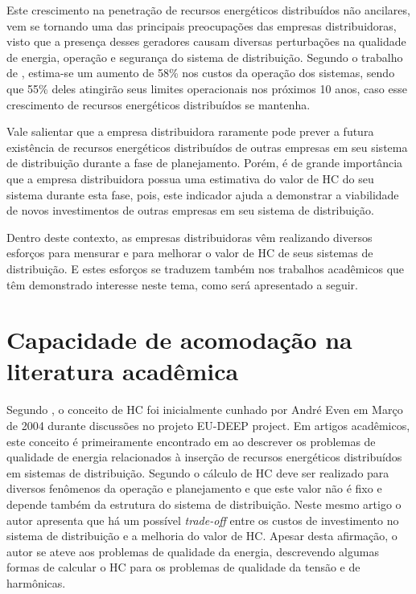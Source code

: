 Este crescimento na penetração de recursos energéticos distribuídos não ancilares, vem se tornando uma das principais preocupações das empresas distribuidoras, visto que a presença desses geradores causam diversas perturbações na qualidade de energia, operação e segurança do sistema de distribuição. Segundo o trabalho de , estima-se um aumento de 58\% nos custos da operação dos sistemas, sendo que 55\% deles atingirão seus limites operacionais nos próximos 10 anos, caso esse crescimento de recursos energéticos distribuídos se mantenha.

Vale salientar que  a empresa distribuidora raramente pode prever a futura existência de recursos energéticos distribuídos de outras empresas em seu sistema de distribuição durante a fase de planejamento. Porém, é de grande importância que a empresa distribuidora possua uma estimativa do valor de \ac{HC} do seu sistema durante esta fase, pois, este indicador ajuda a demonstrar a viabilidade de novos investimentos de outras empresas em seu sistema de distribuição. 

Dentro deste contexto, as empresas distribuidoras vêm realizando diversos esforços para mensurar e para melhorar o valor de HC de seus sistemas de distribuição. E estes esforços se traduzem também nos trabalhos acadêmicos que têm demonstrado interesse neste tema, como será apresentado a seguir.

\section{Capacidade de acomodação na literatura acadêmica}

Segundo , o conceito de HC foi inicialmente cunhado por André Even em Março de 2004 durante discussões no projeto EU-DEEP project. Em artigos acadêmicos, este conceito é primeiramente encontrado em  ao descrever os problemas de qualidade de energia relacionados à inserção de recursos energéticos distribuídos em sistemas de distribuição. Segundo  o cálculo de HC deve ser realizado para diversos fenômenos da operação e planejamento e que este valor não é fixo e depende também da estrutura do sistema de distribuição. Neste mesmo artigo o autor apresenta que há um possível \textit{trade-off} entre os custos de investimento no sistema de distribuição e a melhoria do valor de HC. Apesar desta afirmação, o autor se ateve aos problemas de qualidade da energia, descrevendo algumas formas de calcular o HC para os problemas de qualidade da tensão e de harmônicas.

